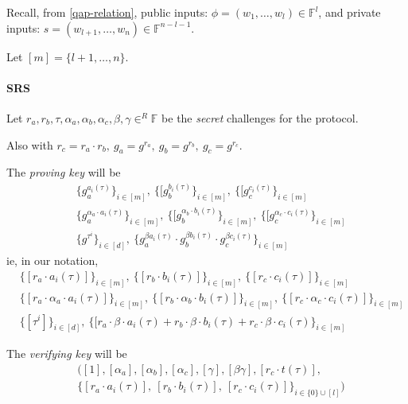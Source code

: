 \documentclass{article}
\begin{document}
Recall, from \ref{qap-relation}, 
public inputs: $\phi = (w_1, \ldots, w_l) \in \mathbb{F}^l$, and private inputs: $s = (w_{l+1}, \ldots, w_n) \in \mathbb{F}^{n-l-1}$.

\vspace{0.3cm}
Let $[m]= \{ l+1, \ldots, n \}$.
\vspace{0.3cm}

\paragraph{SRS}
Let $r_a, r_b, \tau, \alpha_a, \alpha_b, \alpha_c, \beta, \gamma \in^R \mathbb{F}$ be the \emph{secret} challenges for the protocol.

Also with $r_c = r_a \cdot r_b,~ g_a= g^{r_a},~ g_b=g^{r_b},~ g_c = g^{r_c}$.

The \emph{proving key} will be
\begin{align*}
    &\{ g_a^{a_i(\tau)} \}_{i \in [m]},~ \{ [g_b^{b_i(\tau)} \}_{i \in [m]},~ \{ [g_c^{c_i(\tau)} \}_{i \in [m]}\\
    &\{ g_a^{\alpha_a \cdot a_i(\tau)} \}_{i \in [m]},~ \{ [g_b^{\alpha_b \cdot b_i(\tau)} \}_{i \in [m]},~ \{ [g_c^{\alpha_c \cdot c_i(\tau)} \}_{i \in [m]}\\
    &\{ g^{\tau^i} \}_{i \in [d]},~
    \{ g_a^{\beta a_i(\tau)} \cdot g_b^{\beta b_i(\tau)} \cdot g_c^{\beta c_i(\tau)} \}_{i \in [m]}
\end{align*}
ie, in our notation,
\begin{align*}
    &\{ [r_a \cdot a_i(\tau)] \}_{i \in [m]},~ \{ [r_b \cdot b_i(\tau)] \}_{i \in [m]},~ \{ [r_c \cdot c_i(\tau)] \}_{i \in [m]}\\
    &\{ [r_a \cdot \alpha_a \cdot a_i(\tau)] \}_{i \in [m]},~ \{ [r_b \cdot \alpha_b \cdot b_i(\tau)] \}_{i \in [m]},~ \{ [r_c \cdot \alpha_c \cdot c_i(\tau)] \}_{i \in [m]}\\
    &\{[\tau^i]\}_{i \in [d]},~ \{ [r_a \cdot \beta \cdot a_i(\tau) + r_b \cdot \beta \cdot b_i(\tau) + r_c \cdot \beta \cdot c_i(\tau) \}_{i \in [m]}
\end{align*}

The \emph{verifying key} will be
\begin{align*}
    &([1], [\alpha_a], [\alpha_b], [\alpha_c], [\gamma], [\beta \gamma], [r_c \cdot t(\tau)],\\
     &\{[r_a \cdot a_i(\tau)],~ [r_b \cdot b_i(\tau)],~ [r_c \cdot c_i(\tau)] \}_{i \in \{0\} \cup [l]} )
\end{align*}
\end{document}
